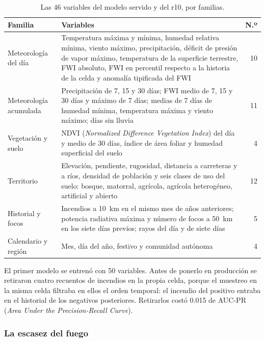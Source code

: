 \documentclass[10pt,a4paper]{article}
\begin{document}
\begin{table}[H]
  \centering
  \caption{Las 46 variables del modelo servido y del r10, por familias.}
  \label{tab:variables}
  \footnotesize
  \begin{tabular}{@{}>{\raggedright}p{3.0cm}>{\raggedright}p{12.4cm}r@{}}
    \toprule
    Familia & Variables & N.º \\
    \midrule
    Meteorología del día & Temperatura máxima y mínima, humedad relativa mínima, viento máximo, precipitación, déficit de presión de vapor máximo, temperatura de la superficie terrestre, FWI absoluto, FWI en percentil respecto a la historia de la celda y anomalía tipificada del FWI & 10 \\
    Meteorología acumulada & Precipitación de 7, 15 y 30 días; FWI medio de 7, 15 y 30 días y máximo de 7 días; medias de 7 días de humedad mínima, temperatura máxima y viento máximo; días sin lluvia & 11 \\
    Vegetación y suelo & NDVI (\emph{Normalized Difference Vegetation Index}) del día y medio de 30 días, índice de área foliar y humedad superficial del suelo & 4 \\
    Territorio & Elevación, pendiente, rugosidad, distancia a carreteras y a ríos, densidad de población y seis clases de uso del suelo: bosque, matorral, agrícola, agrícola heterogéneo, artificial y abierto & 12 \\
    Historial y focos & Incendios a 10~km en el mismo mes de años anteriores; potencia radiativa máxima y número de focos a 50~km en los siete días previos; rayos del día y de siete días & 5 \\
    Calendario y región & Mes, día del año, festivo y comunidad autónoma & 4 \\
    \bottomrule
  \end{tabular}
\end{table}

El primer modelo se entrenó con 50 variables. Antes de ponerlo en producción se
retiraron cuatro recuentos de incendios en la propia celda, porque el muestreo
en la misma celda filtraba en ellos el orden temporal: el incendio del positivo
entraba en el historial de los negativos posteriores. Retirarlos costó 0.015 de
AUC-PR (\emph{Area Under the Precision-Recall Curve}).



\subsubsection{La escasez del fuego}
\label{an:b1-escasez}
\end{document}
